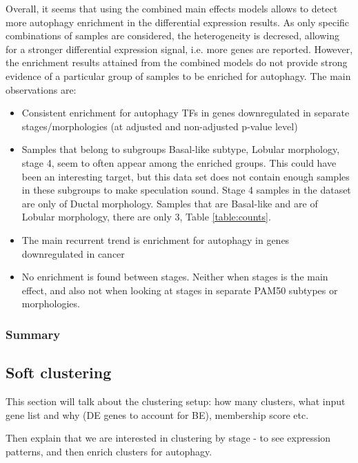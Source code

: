         Overall, it seems that using the combined main effects models allows to detect more autophagy enrichment in the differential expression results. As only specific combinations of samples are considered, the heterogeneity is decresed, allowing for a stronger differential expression signal, i.e. more genes are reported. However, the enrichment results attained from the combined models do not provide strong evidence of a particular group of samples to be enriched for autophagy. The main observations are:
        
        \begin{itemize}
            
        
        \item Consistent enrichment for autophagy TFs in genes downregulated in separate stages/morphologies (at adjusted and non-adjusted p-value level)
        \item Samples that belong to subgroups Basal-like subtype, Lobular morphology, stage 4, seem to often appear among the enriched groups. This could have been an interesting target, but this data set does not contain enough samples in these subgroups to make speculation sound. Stage 4 samples in the dataset are only of Ductal morphology. Samples that are Basal-like and are of Lobular morphology, there are only 3, Table \ref{table:counts}.  
        \item The main recurrent trend is enrichment for autophagy in genes downregulated in cancer
        \item No enrichment is found between stages. Neither when stages is the main effect, and also not when looking at stages in separate PAM50 subtypes or morphologies.
        \end{itemize}
        \subsubsection{Summary}
        

\newpage
    \subsection{Soft clustering}
    
    
        This section will talk about the clustering setup: how many clusters, what input gene list and why (DE genes to account for BE), membership score etc.
        
        Then explain that we are interested in clustering by stage - to see expression patterns, and then enrich clusters for autophagy.
        
